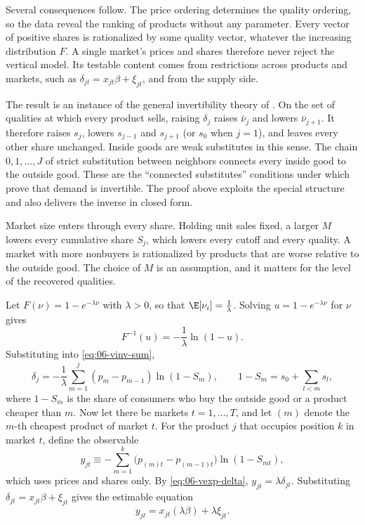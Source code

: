 Several consequences follow. The price ordering determines the quality ordering, so the data reveal the
ranking of products without any parameter. Every vector of positive shares is rationalized by some quality
vector, whatever the increasing distribution $F$. A single market's prices and shares therefore never
reject the vertical model. Its testable content comes from restrictions across products and markets, such
as $\delta_{jt} = x_{jt}\beta + \xi_{jt}$, and from the supply side.

The result is an instance of the general invertibility theory of \citet{BerryGandhiHaile2013}. On the set
of qualities at which every product sells, raising $\delta_j$ raises $\bar\nu_j$ and lowers $\bar\nu_{j+1}$.
It therefore raises $s_j$, lowers $s_{j-1}$ and $s_{j+1}$ (or $s_0$ when $j = 1$), and leaves every other
share unchanged. Inside goods are weak substitutes in this sense. The chain $0, 1, \dots, J$ of strict
substitution between neighbors connects every inside good to the outside good. These are the ``connected
substitutes'' conditions under which \citet{BerryGandhiHaile2013} prove that demand is invertible. The
proof above exploits the special structure and also delivers the inverse in closed form.

Market size enters through every share. Holding unit sales fixed, a larger $M$ lowers every cumulative
share $S_j$, which lowers every cutoff and every quality. A market with more nonbuyers is rationalized by
products that are worse relative to the outside good. The choice of $M$ is an assumption, and it
matters for the level of the recovered qualities.

\begin{example}\label{ex:06-exponential}
Let $F(\nu) = 1 - e^{-\lambda\nu}$ with $\lambda > 0$, so that $\E[\nu_i] = \frac{1}{\lambda}$. Solving
$u = 1 - e^{-\lambda\nu}$ for $\nu$ gives
\begin{equation*}
  F^{-1}(u) = -\frac{1}{\lambda}\ln(1 - u).
\end{equation*}
Substituting into \eqref{eq:06-vinv-sum},
\begin{equation}\label{eq:06-vexp-delta}
  \delta_j = -\frac{1}{\lambda}\sum_{m=1}^{j}(p_m - p_{m-1})\ln(1 - S_m),
  \qquad 1 - S_m = s_0 + \sum_{l < m} s_l ,
\end{equation}
where $1 - S_m$ is the share of consumers who buy the outside good or a product cheaper than $m$. Now let
there be markets $t = 1, \dots, T$, and let $(m)$ denote the $m$-th cheapest product of market $t$. For the
product $j$ that occupies position $k$ in market $t$, define the observable
\begin{equation}\label{eq:06-vexp-y}
  y_{jt} \equiv -\sum_{m=1}^{k}\big(p_{(m)t} - p_{(m-1)t}\big)\ln(1 - S_{mt}),
\end{equation}
which uses prices and shares only. By \eqref{eq:06-vexp-delta}, $y_{jt} = \lambda\delta_{jt}$. Substituting
$\delta_{jt} = x_{jt}\beta + \xi_{jt}$ gives the estimable equation
\begin{equation}\label{eq:06-vexp-reg}
  y_{jt} = x_{jt}(\lambda\beta) + \lambda\xi_{jt} .
\end{equation}
\end{example}

